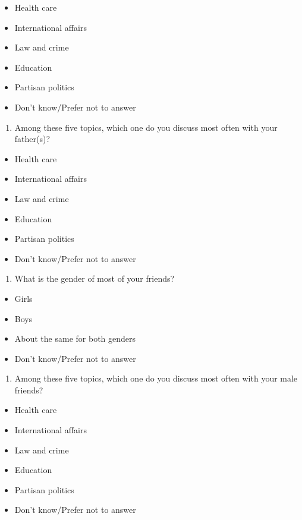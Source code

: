 \documentclass[
  letterpaper,
  DIV=11,
  numbers=noendperiod]{scrreprt}
\providecommand{\tightlist}{%
  \setlength{\itemsep}{0pt}\setlength{\parskip}{0pt}}\usepackage{longtable,booktabs,array}
\begin{document}
\begin{itemize}
\tightlist
\item
  Health care
\item
  International affairs
\item
  Law and crime
\item
  Education
\item
  Partisan politics
\item
  Don't know/Prefer not to answer
\end{itemize}

\begin{enumerate}
\def\labelenumi{\arabic{enumi}.}
\setcounter{enumi}{8}
\tightlist
\item
  Among these five topics, which one do you discuss most often with your
  father(s)?
\end{enumerate}

\begin{itemize}
\tightlist
\item
  Health care
\item
  International affairs
\item
  Law and crime
\item
  Education
\item
  Partisan politics
\item
  Don't know/Prefer not to answer
\end{itemize}

\begin{enumerate}
\def\labelenumi{\arabic{enumi}.}
\setcounter{enumi}{9}
\tightlist
\item
  What is the gender of most of your friends?
\end{enumerate}

\begin{itemize}
\tightlist
\item
  Girls
\item
  Boys
\item
  About the same for both genders
\item
  Don't know/Prefer not to answer
\end{itemize}

\begin{enumerate}
\def\labelenumi{\arabic{enumi}.}
\setcounter{enumi}{10}
\tightlist
\item
  Among these five topics, which one do you discuss most often with your
  male friends?
\end{enumerate}

\begin{itemize}
\tightlist
\item
  Health care
\item
  International affairs
\item
  Law and crime
\item
  Education
\item
  Partisan politics
\item
  Don't know/Prefer not to answer
\end{itemize}
\end{document}
